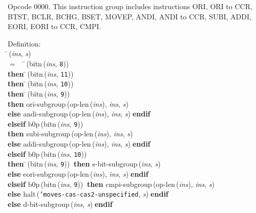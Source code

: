  Opcode 0000.
 This instruction group includes instructions ORI, ORI to CCR, BTST, BCLR,
 BCHG, BSET, MOVEP, ANDI, ANDI to CCR, SUBI, ADDI, EORI, EORI to CCR, CMPI.
\begin{tabbing}{\sc Definition}: \\  
\=\,({\it{ins\/}}, {\it{s\/}}) \\ 
$=$$\;\;\;\;$\=\,({\rm{bitn}}\,({\it{ins\/}}, {\tt{8}})) \\ 
{\bf then }\=\,({\rm{bitn}}\,({\it{ins\/}}, {\tt{11}})) \\ 
{\bf then }\=\,({\rm{bitn}}\,({\it{ins\/}}, {\tt{10}})) \\ 
{\bf then }\=\,({\rm{bitn}}\,({\it{ins\/}}, {\tt{9}})) \\ 
{\bf then }{\rm{ori-subgroup}}\,({\rm{op-len}}\,({\it{ins\/}}), {\it{ins\/}}, {\it{s\/}}) \\ 
{\bf else }{\rm{andi-subgroup}}\,({\rm{op-len}}\,({\it{ins\/}}), {\it{ins\/}}, {\it{s\/}})$\;${\bf  endif}\- \\ 
{\bf elseif }{\rm{b0p}}\,({\rm{bitn}}\,({\it{ins\/}}, {\tt{9}})) \\ 
{\bf then }{\rm{subi-subgroup}}\,({\rm{op-len}}\,({\it{ins\/}}), {\it{ins\/}}, {\it{s\/}}) \\ 
{\bf else }{\rm{addi-subgroup}}\,({\rm{op-len}}\,({\it{ins\/}}), {\it{ins\/}}, {\it{s\/}})$\;${\bf  endif}\- \\ 
{\bf elseif }{\rm{b0p}}\,({\rm{bitn}}\,({\it{ins\/}}, {\tt{10}})) \\ 
{\bf then }\=\,({\rm{bitn}}\,({\it{ins\/}}, {\tt{9}}))$\;\;${\bf then }{\rm{s-bit-subgroup}}\,({\it{ins\/}}, {\it{s\/}}) \\ 
{\bf else }{\rm{eori-subgroup}}\,({\rm{op-len}}\,({\it{ins\/}}), {\it{ins\/}}, {\it{s\/}})$\;${\bf  endif}\- \\ 
{\bf elseif }{\rm{b0p}}\,({\rm{bitn}}\,({\it{ins\/}}, {\tt{9}}))$\;\;${\bf then }{\rm{cmpi-subgroup}}\,({\rm{op-len}}\,({\it{ins\/}}), {\it{ins\/}}, {\it{s\/}}) \\ 
{\bf else }{\rm{halt}}\,({\tt{'}}{\tt{moves-cas-cas2-unspecified}}, {\it{s\/}})$\;${\bf  endif}\- \\ 
{\bf else }{\rm{d-bit-subgroup}}\,({\it{ins\/}}, {\it{s\/}})$\;${\bf  endif}\-\-
\end{tabbing}

